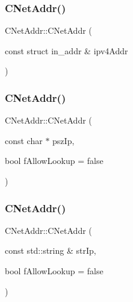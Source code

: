 \subsubsection{\texorpdfstring{C\+Net\+Addr()}{CNetAddr()}\hspace{0.1cm}{\footnotesize\ttfamily [2/5]}}
{\footnotesize\ttfamily C\+Net\+Addr\+::\+C\+Net\+Addr (\begin{DoxyParamCaption}\item[{const struct in\+\_\+addr \&}]{ipv4\+Addr }\end{DoxyParamCaption})}

\mbox{\label{class_c_net_addr_a3549332f92d95ccadf262bdce9f4eacf}} 
\subsubsection{\texorpdfstring{C\+Net\+Addr()}{CNetAddr()}\hspace{0.1cm}{\footnotesize\ttfamily [3/5]}}
{\footnotesize\ttfamily C\+Net\+Addr\+::\+C\+Net\+Addr (\begin{DoxyParamCaption}\item[{const char $\ast$}]{psz\+Ip,  }\item[{bool}]{f\+Allow\+Lookup = {\ttfamily false} }\end{DoxyParamCaption})\hspace{0.3cm}{\ttfamily [explicit]}}

\mbox{\label{class_c_net_addr_ae237602be0e4bce6ff31061270371144}} 
\subsubsection{\texorpdfstring{C\+Net\+Addr()}{CNetAddr()}\hspace{0.1cm}{\footnotesize\ttfamily [4/5]}}
{\footnotesize\ttfamily C\+Net\+Addr\+::\+C\+Net\+Addr (\begin{DoxyParamCaption}\item[{const std\+::string \&}]{str\+Ip,  }\item[{bool}]{f\+Allow\+Lookup = {\ttfamily false} }\end{DoxyParamCaption})\hspace{0.3cm}{\ttfamily [explicit]}}

